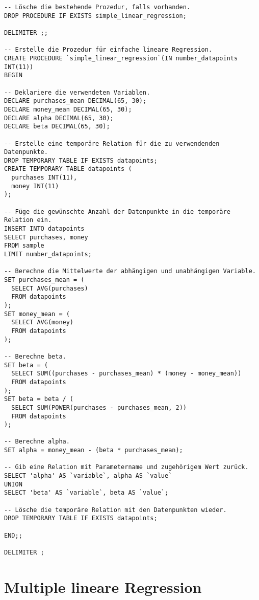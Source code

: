 \begin{verbatim}
-- Lösche die bestehende Prozedur, falls vorhanden.
DROP PROCEDURE IF EXISTS simple_linear_regression;

DELIMITER ;;

-- Erstelle die Prozedur für einfache lineare Regression.
CREATE PROCEDURE `simple_linear_regression`(IN number_datapoints INT(11))
BEGIN

-- Deklariere die verwendeten Variablen.
DECLARE purchases_mean DECIMAL(65, 30);
DECLARE money_mean DECIMAL(65, 30);
DECLARE alpha DECIMAL(65, 30);
DECLARE beta DECIMAL(65, 30);

-- Erstelle eine temporäre Relation für die zu verwendenden Datenpunkte.
DROP TEMPORARY TABLE IF EXISTS datapoints;
CREATE TEMPORARY TABLE datapoints (
  purchases INT(11),
  money INT(11)
);

-- Füge die gewünschte Anzahl der Datenpunkte in die temporäre Relation ein.
INSERT INTO datapoints
SELECT purchases, money
FROM sample
LIMIT number_datapoints;

-- Berechne die Mittelwerte der abhängigen und unabhängigen Variable.
SET purchases_mean = (
  SELECT AVG(purchases)
  FROM datapoints
);
SET money_mean = (
  SELECT AVG(money)
  FROM datapoints
);

-- Berechne beta.
SET beta = (
  SELECT SUM((purchases - purchases_mean) * (money - money_mean))
  FROM datapoints
);
SET beta = beta / (
  SELECT SUM(POWER(purchases - purchases_mean, 2))
  FROM datapoints
);

-- Berechne alpha.
SET alpha = money_mean - (beta * purchases_mean);

-- Gib eine Relation mit Parametername und zugehörigem Wert zurück.
SELECT 'alpha' AS `variable`, alpha AS `value`
UNION
SELECT 'beta' AS `variable`, beta AS `value`;

-- Lösche die temporäre Relation mit den Datenpunkten wieder.
DROP TEMPORARY TABLE IF EXISTS datapoints;

END;;

DELIMITER ;
\end{verbatim}

\section{Multiple lineare Regression}
\label{appendix:D:2}

